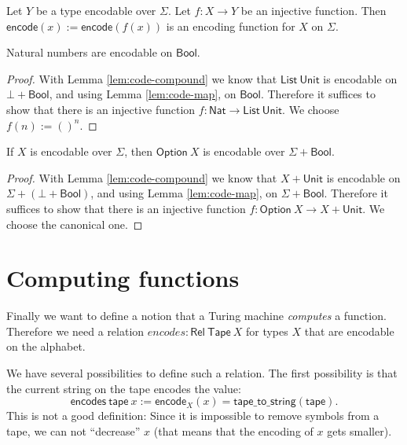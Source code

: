 \documentclass{psartcl}
\newcommand{\MS}[1]{\textsf{#1}}
\newcommand{\from}{:}
\renewcommand{\to}{\rightarrow}
\newcommand{\Option}{\MS{Option}}
\newcommand{\Bool}{\MS{Bool}}
\newcommand{\Nat}{\MS{Nat}}
\newcommand{\Unit}{\MS{Unit}}
\newcommand{\List}{\MS{List}}
\newcommand{\unit}{\mathbf{()}}
\newcommand{\Rel}{\mathsf{Rel}}
\newcommand{\Tape}{\MS{Tape}}
\begin{document}
\begin{lemma}
  \label{lem:code-reduce}
  Let $Y$ be a type encodable over $\Sigma$.
  Let $f \from X \to Y$ be an injective function.
  Then $\MS{encode}(x) := \MS{encode}(f(x))$ is an encoding function for $X$ on $\Sigma$.
\end{lemma}

\begin{corollary}
  \label{lem:code-nat}
  Natural numbers are encodable on $\Bool$.
\end{corollary}
\begin{proof}
  With Lemma \ref{lem:code-compound} we know that $\List~\Unit$ is encodable on $\bot + \Bool$, and using Lemma \ref{lem:code-map}, on $\Bool$.
  Therefore it suffices to show that there is an injective function $f \from \Nat \to \List~\Unit$.
  We choose $f(n) := \unit^n$.
\end{proof}

\begin{corollary}
  \label{lem:code-option}
  If $X$ is encodable over $\Sigma$, then
  $\Option~X$ is encodable over $\Sigma + \Bool$.
\end{corollary}
\begin{proof}
  With Lemma \ref{lem:code-compound} we know that $X + \Unit$ is encodable on $\Sigma + (\bot + \Bool)$, and using Lemma \ref{lem:code-map}, on
  $\Sigma + \Bool$.  Therefore it suffices to show that there is an injective function $f \from \Option~X \to X + \Unit$.
  We choose the canonical one.
\end{proof}


\section{Computing functions}

Finally we want to define a notion that a Turing machine \emph{computes} a function.
Therefore we need a relation $encodes : \Rel~\Tape~X$ for types $X$ that are encodable on the alphabet.

We have several possibilities to define such a relation.  The first possibility is that the current string on the tape encodes the value:
$$\MS{encodes}~\MS{tape}~x:= \MS{encode}_X(x) = \MS{tape\_to\_string}(\MS{tape}).$$
This is not a good definition: Since it is impossible to remove symbols from a tape, we can not ``decrease'' $x$ (that means that the encoding of
$x$ gets smaller).
\end{document}
